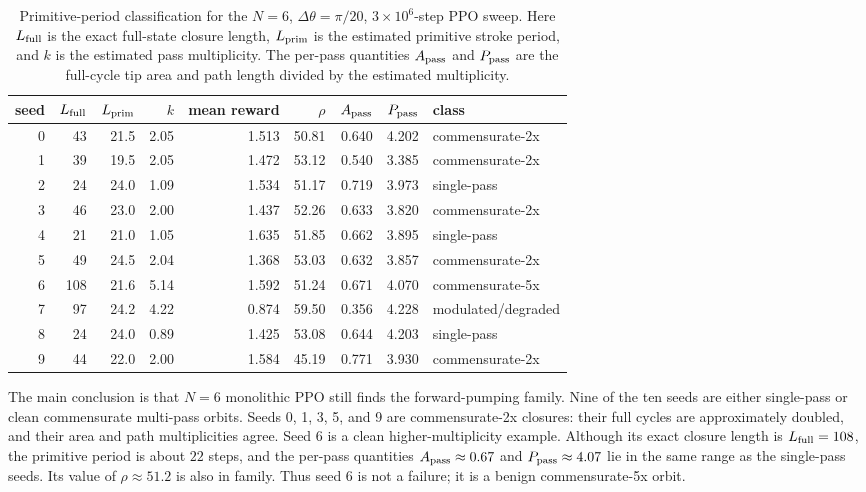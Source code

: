 \documentclass[11pt]{article}
\begin{document}
\begin{table}[htbp]
\centering
\scriptsize
\begin{tabular}{rrrrrrrrl}
\toprule
seed & $L_{\rm full}$ & $L_{\rm prim}$ & $k$
& mean reward & $\rho$ & $A_{\rm pass}$ & $P_{\rm pass}$ & class \\
\midrule
0 & 43  & 21.5 & 2.05 & 1.513 & 50.81 & 0.640 & 4.202 & commensurate-2x \\
1 & 39  & 19.5 & 2.05 & 1.472 & 53.12 & 0.540 & 3.385 & commensurate-2x \\
2 & 24  & 24.0 & 1.09 & 1.534 & 51.17 & 0.719 & 3.973 & single-pass \\
3 & 46  & 23.0 & 2.00 & 1.437 & 52.26 & 0.633 & 3.820 & commensurate-2x \\
4 & 21  & 21.0 & 1.05 & 1.635 & 51.85 & 0.662 & 3.895 & single-pass \\
5 & 49  & 24.5 & 2.04 & 1.368 & 53.03 & 0.632 & 3.857 & commensurate-2x \\
6 & 108 & 21.6 & 5.14 & 1.592 & 51.24 & 0.671 & 4.070 & commensurate-5x \\
7 & 97  & 24.2 & 4.22 & 0.874 & 59.50 & 0.356 & 4.228 & modulated/degraded \\
8 & 24  & 24.0 & 0.89 & 1.425 & 53.08 & 0.644 & 4.203 & single-pass \\
9 & 44  & 22.0 & 2.00 & 1.584 & 45.19 & 0.771 & 3.930 & commensurate-2x \\
\bottomrule
\end{tabular}
\caption{Primitive-period classification for the $N=6$, $\Delta\theta=\pi/20$, $3\times 10^6$-step PPO sweep. Here $L_{\rm full}$ is the exact full-state closure length, $L_{\rm prim}$ is the estimated primitive stroke period, and $k$ is the estimated pass multiplicity. The per-pass quantities $A_{\rm pass}$ and $P_{\rm pass}$ are the full-cycle tip area and path length divided by the estimated multiplicity.}
\label{tab:n6-primitive-periods}
\end{table}


The main conclusion is that $N=6$ monolithic PPO still finds the forward-pumping family. Nine of the ten seeds are either single-pass or clean commensurate multi-pass orbits. Seeds 0, 1, 3, 5, and 9 are commensurate-2x closures: their full cycles are approximately doubled, and their area and path multiplicities agree. Seed 6 is a clean higher-multiplicity example. Although its exact closure length is $L_{\rm full}=108$, the primitive period is about $22$ steps, and the per-pass quantities $A_{\rm pass}\approx 0.67$ and $P_{\rm pass}\approx 4.07$ lie in the same range as the single-pass seeds. Its value of $\rho\approx 51.2$ is also in family. Thus seed 6 is not a failure; it is a benign commensurate-5x orbit.
\end{document}
